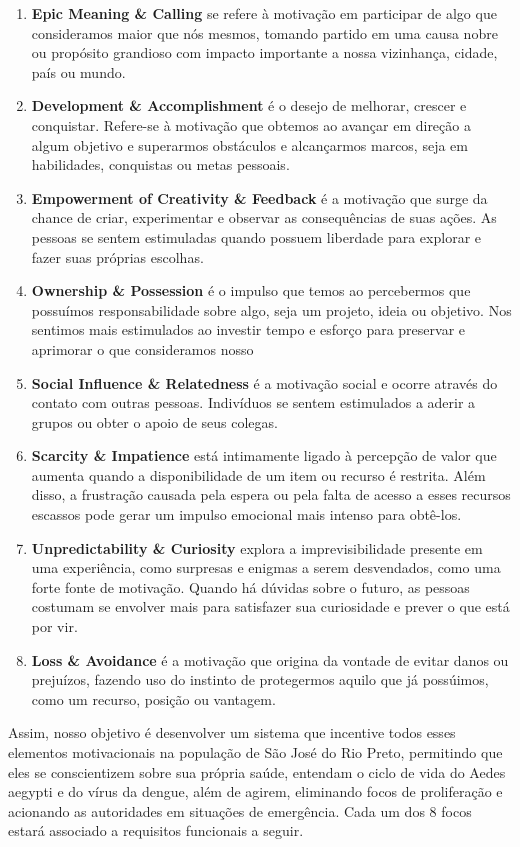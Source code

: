 \documentclass[a4paper, 12pt]{article}
\begin{document}
\begin{enumerate}
    \item \textbf{Epic Meaning \& Calling} se refere à motivação em participar de algo que consideramos maior que nós mesmos, tomando partido em uma causa nobre ou propósito grandioso com impacto importante a nossa vizinhança, cidade, país ou mundo. 
    \item \textbf{Development \& Accomplishment} é o desejo de melhorar, crescer e conquistar. Refere-se à motivação que obtemos ao avançar em direção a algum objetivo e superarmos obstáculos e alcançarmos marcos, seja em habilidades, conquistas ou metas pessoais.
    \item \textbf{Empowerment of Creativity \& Feedback} é a motivação que surge da chance de criar, experimentar e observar as consequências de suas ações. As pessoas se sentem estimuladas quando possuem liberdade para explorar e fazer suas próprias escolhas. 
    \item \textbf{Ownership \& Possession} é o impulso que temos ao percebermos que possuímos responsabilidade sobre algo, seja um projeto, ideia ou objetivo. Nos sentimos mais estimulados ao investir tempo e esforço para preservar e aprimorar o que consideramos nosso
    \item \textbf{Social Influence \& Relatedness} é a motivação social e ocorre através do contato com outras pessoas. Indivíduos se sentem estimulados a aderir a grupos ou  obter o apoio de seus colegas. 
    \item \textbf{Scarcity \& Impatience} está intimamente ligado à percepção de valor que aumenta quando a disponibilidade de um item ou recurso é restrita. Além disso, a frustração causada pela espera ou pela falta de acesso a esses recursos escassos pode gerar um impulso emocional mais intenso para obtê-los.
    \item \textbf{Unpredictability \& Curiosity} explora a imprevisibilidade presente em uma experiência, como surpresas e enigmas a serem desvendados, como uma forte fonte de motivação. Quando há dúvidas sobre o futuro, as pessoas costumam se envolver mais para satisfazer sua curiosidade e prever o que está por vir.
    \item \textbf{Loss \& Avoidance} é a motivação que origina da vontade de evitar danos ou prejuízos, fazendo uso do instinto de protegermos aquilo que já possúimos, como um recurso, posição ou vantagem.
\end{enumerate}

Assim, nosso objetivo é desenvolver um sistema que incentive todos esses elementos motivacionais na população de São José do Rio Preto, permitindo que eles se conscientizem sobre sua própria saúde, entendam o ciclo de vida do Aedes aegypti e do vírus da dengue, além de agirem, eliminando focos de proliferação e acionando as autoridades em situações de emergência. Cada um dos 8 focos estará associado a requisitos funcionais a seguir.
\end{document}
